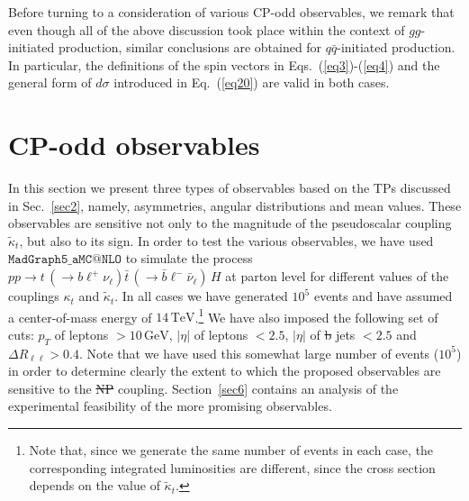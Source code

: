 \documentclass[aps,preprint,tightenlines,floatfix,superscriptaddress,nofootinbib,showpacs]{revtex4-1}
\def\tbar{\bar{t}}
\def\bbar{\bar{b}}
\def\qbar{\bar{q}}
\def\nubar{{\bar{\nu}}_{\ell}}
\def\ppprocess{pp\to t\,\left(\rightarrow b {\ell}^+ \nu_{\ell}\right) \tbar\,\left(\rightarrow\bbar {\ell}^-\nubar\right)\,H}
\def\kp{\kappa_t}
\def\kpt{\tilde{\kappa}_t}
\providecommand{\DIFadd}[1]{{\protect\color{blue}\uwave{#1}}} %
\providecommand{\DIFdel}[1]{{\protect\color{red}\sout{#1}}}                      %
\providecommand{\DIFaddbegin}{} %
\providecommand{\DIFaddend}{} %
\providecommand{\DIFdelbegin}{} %
\providecommand{\DIFdelend}{} %
\begin{document}
Before turning to a consideration of various CP-odd observables,
we remark that even though all of the above discussion took place
within the context of $gg$-initiated production, similar conclusions
are obtained for $q\qbar$-initiated production. In particular, the
definitions of the spin vectors in Eqs.~(\ref{eq3})-(\ref{eq4}) and
the general form of $d\sigma$ introduced in Eq.~(\ref{eq20}) are valid
in both cases.
\bigskip
\section{$\mathrm{\mathbf{CP}}$-odd observables}
\label{sec3}
In this section we present three types of observables based on the TPs discussed
in Sec.~\ref{sec2}, namely, asymmetries, angular
distributions and mean values. These observables are sensitive not only to the
magnitude of the pseudoscalar coupling $\kpt$, but also to its
sign.  In order to test the various observables, we have
used $\mathtt{MadGraph5\_aMC@NLO}$ \cite{Madgraph} to simulate the process
$\ppprocess$ at parton level for different values of the couplings
$\kp$ and $\kpt$.  In all cases we have generated $10^5$ events
and have assumed a center-of-mass energy of
$14\,\mathrm{TeV}$.\footnote{Note that, since we generate
  the same number of events in
  each case, the corresponding integrated luminosities are different, since the
  cross section depends on the value of $\kpt$.}
We have also imposed the
following set of cuts: $p_T$ of leptons $> 10\,\mathrm{GeV}$, $|\eta|$
of leptons $< 2.5$, $|\eta|$ of \DIFdelbegin \DIFdel{b }\DIFdelend \DIFaddbegin \DIFadd{$b$ }\DIFaddend jets $< 2.5$ and $\Delta
R_{\ell\ell}>0.4$.  Note that we have used this
somewhat large number of events ($10^5$) in order to determine clearly
the extent to which the proposed observables are sensitive to the \DIFdelbegin \DIFdel{NP
}\DIFdelend \DIFaddbegin \DIFadd{anomalous
}\DIFaddend coupling.  Section~\ref{sec6} contains an
analysis of the experimental feasibility of the more promising observables.
\end{document}
